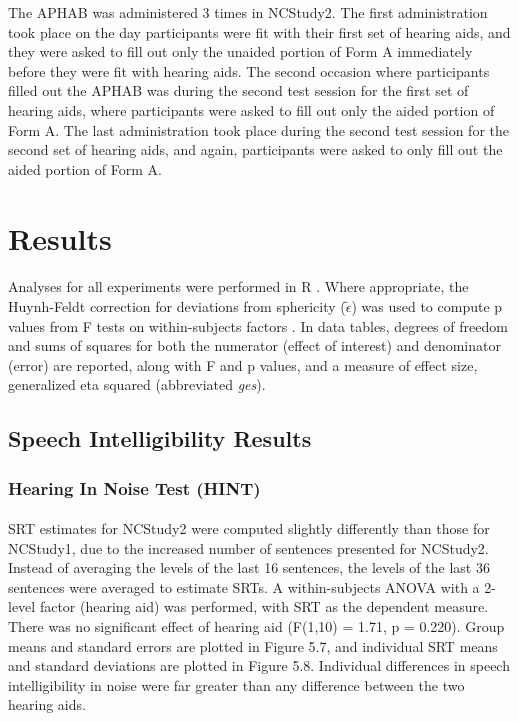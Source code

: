The APHAB was administered 3 times in NCStudy2.  The first administration took place on the day participants were fit with their first set of hearing aids, and they were asked to fill out only the unaided portion of Form A immediately before they were fit with hearing aids.  The second occasion where participants filled out the APHAB was during the second test session for the first set of hearing aids, where participants were asked to fill out only the aided portion of Form A.  The last administration took place during the second test session for the second set of hearing aids, and again, participants were asked to only fill out the aided portion of Form A.

\section{Results}
\paragraph{}Analyses for all experiments were performed in R \cite{R2013}.  Where appropriate, the Huynh-Feldt correction for deviations from sphericity ($\tilde{\epsilon}$) was used to compute p values from F tests on within-subjects factors \cite{Maxwell2004}.  In data tables, degrees of freedom and sums of squares for both the numerator (effect of interest) and denominator (error) are reported, along with F and p values, and a measure of effect size, generalized eta squared (abbreviated \emph{ges}).

\subsection{Speech Intelligibility Results}
\subsubsection{Hearing In Noise Test (HINT)}
\paragraph{}SRT estimates for NCStudy2 were computed slightly differently than those for NCStudy1, due to the increased number of sentences presented for NCStudy2.  Instead of averaging the levels of the last 16 sentences, the levels of the last 36 sentences were averaged to estimate SRTs.  A within-subjects ANOVA with a 2-level factor (hearing aid) was performed, with SRT as the dependent measure.  There was no significant effect of hearing aid (F(1,10) = 1.71, p = 0.220).  Group means and standard errors are plotted in Figure 5.7, and individual SRT means and standard deviations are plotted in Figure 5.8.  Individual differences in speech intelligibility in noise were far greater than any difference between the two hearing aids.

